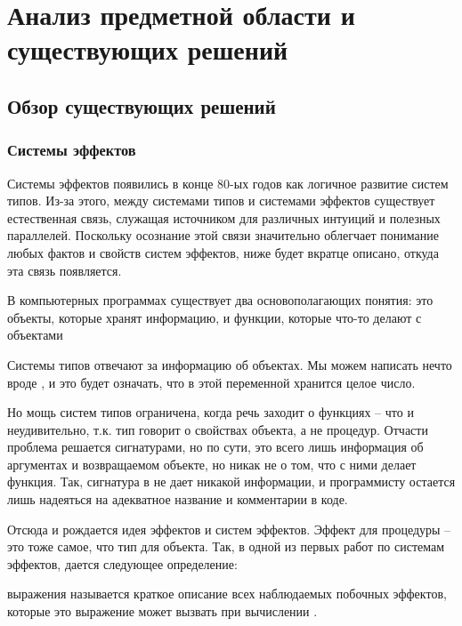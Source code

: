 \section{Анализ предметной области и существующих решений }


\subsection{Обзор существующих решений}


\subsubsection{Системы эффектов}

Системы эффектов появились в конце 80-ых годов как логичное развитие систем типов. Из-за этого, между системами типов и системами эффектов существует естественная связь, служащая источником для различных интуиций и полезных параллелей. Поскольку осознание этой связи значительно облегчает понимание любых фактов и свойств систем эффектов, ниже будет вкратце описано, откуда эта связь появляется.

\bigskip

В компьютерных программах существует два основополагающих понятия: это объекты, которые хранят информацию, и функции, которые что-то делают с объектами

Системы типов отвечают за информацию об объектах. Мы можем написать нечто вроде , и это будет означать, что в этой переменной хранится целое число.

Но мощь систем типов ограничена, когда речь заходит о функциях -- что и неудивительно, т.к. тип говорит о свойствах объекта, а не процедур. Отчасти проблема решается сигнатурами, но по сути, это всего лишь информация об аргументах и возвращаемом объекте, но никак не о том, что с ними делает функция. Так, сигнатура  в  не дает никакой информации, и программисту остается лишь надеяться на адекватное название и комментарии в коде.

Отсюда и рождается идея эффектов и систем эффектов. Эффект для процедуры -- это тоже самое, что тип для объекта. Так, в одной из первых работ по системам эффектов, дается следующее определение:

\begin{definition}
   выражения называется краткое описание всех наблюдаемых побочных эффектов, которые это выражение может вызвать при вычислении \cite{Luc88}.
  \label{def-effect}
\end{definition}

